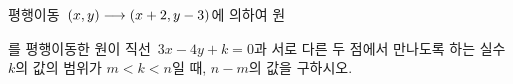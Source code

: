 평행이동~$(x{,}\mkern3mu\mathopen{}y)\longrightarrow(x+2{,}\mkern3mu\mathopen{}y-3)$에 의하여 원\par\smallskip{}\par\smallskip\noindent 를 평행이동한 원이 직선~$3x-4y+k=0$과 서로 다른 두 점에서 만나도록 하는 실수 $k$의 값의 범위가 $m<k<n$일 때, $n-m$의 값을 구하시오.
